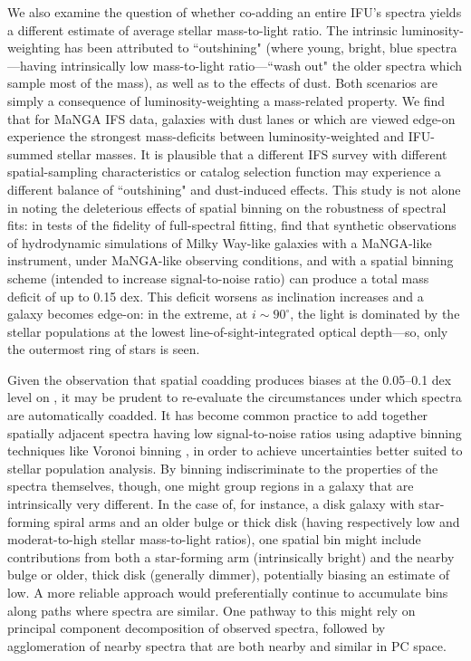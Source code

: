 We also examine the question of whether co-adding an entire IFU's spectra yields a different estimate of average stellar mass-to-light ratio. The intrinsic luminosity-weighting has been attributed to ``outshining" (where young, bright, blue spectra---having intrinsically low mass-to-light ratio---``wash out" the older spectra which sample most of the mass), as well as to the effects of dust. Both scenarios are simply a consequence of luminosity-weighting a mass-related property. We find that for MaNGA IFS data, galaxies with dust lanes or which are viewed edge-on experience the strongest mass-deficits between luminosity-weighted and IFU-summed stellar masses. It is plausible that a different IFS survey with different spatial-sampling characteristics or catalog selection function may experience a different balance of ``outshining" and dust-induced effects. This study is not alone in noting the deleterious effects of spatial binning on the robustness of spectral fits: in tests of the fidelity of full-spectral fitting, \citet{ibarra-medel_avila-reese_19} find that synthetic observations of hydrodynamic simulations of Milky Way-like galaxies with a MaNGA-like instrument, under MaNGA-like observing conditions, and with a spatial binning scheme (intended to increase signal-to-noise ratio) can produce a total mass deficit of up to 0.15 dex. This deficit worsens as inclination increases and a galaxy becomes edge-on: in the extreme, at $i \sim 90^{\circ}$, the light is dominated by the stellar populations at the lowest line-of-sight-integrated optical depth---so, only the outermost ring of stars is seen.

Given the observation that spatial coadding produces biases at the 0.05--0.1 dex level on , it may be prudent to re-evaluate the circumstances under which spectra are automatically coadded. It has become common practice to add together spatially adjacent spectra having low signal-to-noise ratios using adaptive binning techniques like Voronoi binning \citep{cappellari_voronoi}, in order to achieve uncertainties better suited to stellar population analysis. By binning indiscriminate to the properties of the spectra themselves, though, one might group regions in a galaxy that are intrinsically very different. In the case of, for instance, a disk galaxy with star-forming spiral arms and an older bulge or thick disk (having respectively low and moderat-to-high stellar mass-to-light ratios), one spatial bin might include contributions from both a star-forming arm (intrinsically bright) and the nearby bulge or older, thick disk (generally dimmer), potentially biasing an estimate of  low. A more reliable approach would preferentially continue to accumulate bins along paths where spectra are similar. One pathway to this might rely on principal component decomposition of observed spectra, followed by agglomeration of nearby spectra that are both nearby and similar in PC space.

